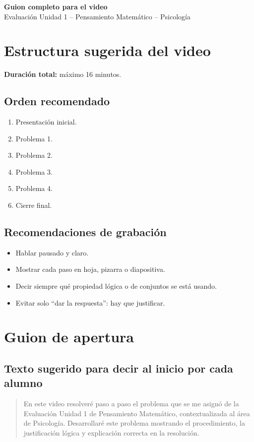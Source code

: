 \documentclass[12pt]{article}
\begin{document}
	
	\begin{center}
		{\LARGE \textbf{Guion completo para el video}}\\[0.3cm]
		{\large Evaluación Unidad 1 -- Pensamiento Matemático -- Psicología}
	\end{center}
	
	\vspace{0.4cm}
	
	\section*{Estructura sugerida del video}
	
	\textbf{Duración total:} máximo	16 minutos.
	
	\subsection*{Orden recomendado}
	\begin{enumerate}
		\item Presentación inicial.
		\item Problema 1.
		\item Problema 2.
		\item Problema 3.
		\item Problema 4.
		\item Cierre final.
	\end{enumerate}
	
	\subsection*{Recomendaciones de grabación}
	\begin{itemize}
		\item Hablar pausado y claro.
		\item Mostrar cada paso en hoja, pizarra o diapositiva.
		\item Decir siempre qué propiedad lógica o de conjuntos se está usando.
		\item Evitar solo ``dar la respuesta'': hay que justificar.
	\end{itemize}
	
	\section*{Guion de apertura}
	
	\subsection{Texto sugerido para decir al inicio por cada alumno}
	\begin{quote}
		En este video resolveré paso a paso el problema que se me asignó de la  Evaluación Unidad 1 de Pensamiento Matemático, contextualizada al área de Psicología. Desarrollaré este problema mostrando el procedimiento, la justificación lógica y explicación correcta en la resolución.
	\end{quote}
\newpage	
\end{document}
